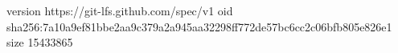 version https://git-lfs.github.com/spec/v1
oid sha256:7a10a9ef81bbe2aa9c379a2a945aa32298ff772de57bc6cc2c06bfb805e826e1
size 15433865
